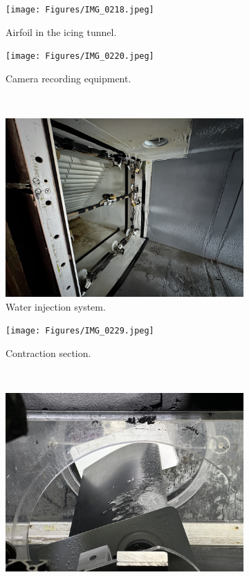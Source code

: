 \begin{figure}[htpb]
    \centering
    \begin{subfigure}{0.49\textwidth}
        \centering
        \texttt{[image: Figures/IMG\_0218.jpeg]}
        \caption{Airfoil in the icing tunnel.}
        \label{fig:airfoil_in_tunnel}
    \end{subfigure}
    \begin{subfigure}{0.49\textwidth}
        \centering
        \texttt{[image: Figures/IMG\_0220.jpeg]}
        \caption{Camera recording equipment.}
        \label{fig:camera_equipment.}
    \end{subfigure}\\
    \begin{subfigure}{0.49\textwidth}
        \centering
        \includegraphics[width=\textwidth]{Figures/IMG_0228.jpeg}
        \caption{Water injection system.}
        \label{fig:water_injector}
    \end{subfigure}    
    \begin{subfigure}{0.49\textwidth}
        \centering
        \texttt{[image: Figures/IMG\_0229.jpeg]}
        \caption{Contraction section.}
        \label{fig:contraction_section}
    \end{subfigure}\\
    \begin{subfigure}{0.49\textwidth}
        \centering
        \includegraphics[width=\textwidth]{Figures/IMG_0225.jpeg}

\end{subfigure}
\end{figure}
